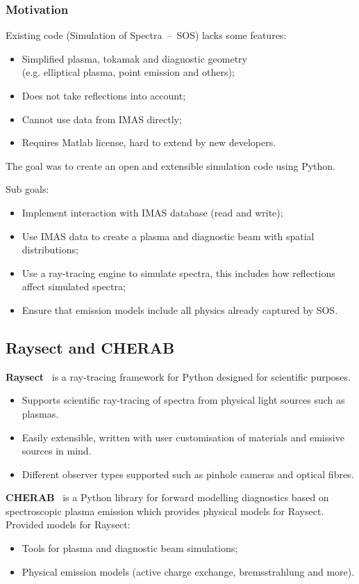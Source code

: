 \documentclass[../main.tex]{subfiles}
\begin{document}
\subsubsection{Motivation}
Existing code (Simulation of Spectra~--~SOS) lacks some features:
\begin{itemize}
    \item Simplified plasma, tokamak and diagnostic geometry \\
          (e.g. elliptical plasma, point emission and others);
    \item Does not take reflections into account;
    \item Cannot use data from IMAS directly;
    \item Requires Matlab license, hard to extend by new developers.
\end{itemize}

The goal was to create an open and extensible simulation code using Python.

Sub goals:
\begin{itemize}
    \item Implement interaction with IMAS database (read and write);
    \item Use IMAS data to create a plasma and diagnostic beam with spatial distributions;
    \item Use a ray-tracing engine to simulate spectra, this includes how reflections affect simulated spectra;
    \item Ensure that emission models include all physics already captured by SOS.
\end{itemize}


\subsection{Raysect and CHERAB}

\textbf{Raysect}~\cite{raysect} is a ray-tracing framework for Python designed for scientific purposes.
\begin{itemize}
    \item Supports scientific ray-tracing of spectra from physical light sources such as plasmas.
    \item Easily extensible, written with user customisation of materials and emissive sources in mind.
    \item Different observer types supported such as pinhole cameras and optical fibres.
\end{itemize}

\textbf{CHERAB}~\cite{cherab} is a Python library for forward modelling diagnostics based on spectroscopic plasma emission which provides physical models for Raysect.
Provided models for Raysect:
\begin{itemize}
    \item Tools for plasma and diagnostic beam simulations;
    \item Physical emission models (active charge exchange, bremsstrahlung and more).
\end{itemize}
\end{document}
